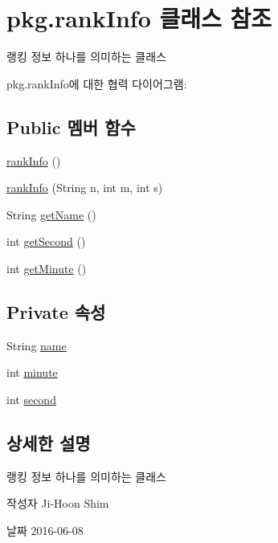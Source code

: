 \hypertarget{classpkg_1_1rank_info}{}\section{pkg.\+rank\+Info 클래스 참조}
\label{classpkg_1_1rank_info}


랭킹 정보 하나를 의미하는 클래스  




pkg.\+rank\+Info에 대한 협력 다이어그램\+:
\subsection*{Public 멤버 함수}
\begin{DoxyCompactItemize}
\item 
\hyperlink{classpkg_1_1rank_info_ada6fd8b79cf529aff459a0a9187b1466}{rank\+Info} ()
\item 
\hyperlink{classpkg_1_1rank_info_a2c81a0ab2e645ba0d81d04b14189bedd}{rank\+Info} (String n, int m, int s)
\item 
String \hyperlink{classpkg_1_1rank_info_a932b15a0277c05f772dd6469c872f497}{get\+Name} ()
\item 
int \hyperlink{classpkg_1_1rank_info_a60abc8500ee5e19582f44994932a5f32}{get\+Second} ()
\item 
int \hyperlink{classpkg_1_1rank_info_a4d5ebf729e4c5ecd82928476f9870a14}{get\+Minute} ()
\end{DoxyCompactItemize}
\subsection*{Private 속성}
\begin{DoxyCompactItemize}
\item 
String \hyperlink{classpkg_1_1rank_info_a9827a3e66334934e04ad16c3d6c9954f}{name}
\item 
int \hyperlink{classpkg_1_1rank_info_a02ae2e5a3865d1d41c4976b03828665c}{minute}
\item 
int \hyperlink{classpkg_1_1rank_info_ac7779be368adc4404ae97f34bc2809aa}{second}
\end{DoxyCompactItemize}


\subsection{상세한 설명}
랭킹 정보 하나를 의미하는 클래스 

\begin{DoxyAuthor}{작성자}
Ji-\/\+Hoon Shim 
\end{DoxyAuthor}
\begin{DoxyDate}{날짜}
2016-\/06-\/08 
\end{DoxyDate}


